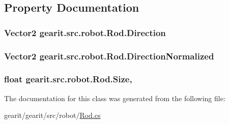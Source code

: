 \subsection{Property Documentation}
\hypertarget{classgearit_1_1src_1_1robot_1_1_rod_aeecb39515796a074caf0159df0a8620a}{
\subsubsection[{Direction}]{\setlength{\rightskip}{0pt plus 5cm}Vector2 gearit.\+src.\+robot.\+Rod.\+Direction\hspace{0.3cm}{\ttfamily [get]}}}\label{classgearit_1_1src_1_1robot_1_1_rod_aeecb39515796a074caf0159df0a8620a}
\hypertarget{classgearit_1_1src_1_1robot_1_1_rod_a167a5c3f6a6c7706a260fcef37f9f2d3}{
\subsubsection[{Direction\+Normalized}]{\setlength{\rightskip}{0pt plus 5cm}Vector2 gearit.\+src.\+robot.\+Rod.\+Direction\+Normalized\hspace{0.3cm}{\ttfamily [get]}}}\label{classgearit_1_1src_1_1robot_1_1_rod_a167a5c3f6a6c7706a260fcef37f9f2d3}
\hypertarget{classgearit_1_1src_1_1robot_1_1_rod_ad81d14d21b0fadeea0babed4dd2dd74a}{
\subsubsection[{Size}]{\setlength{\rightskip}{0pt plus 5cm}float gearit.\+src.\+robot.\+Rod.\+Size\hspace{0.3cm}{\ttfamily [get]}, {\ttfamily [set]}}}\label{classgearit_1_1src_1_1robot_1_1_rod_ad81d14d21b0fadeea0babed4dd2dd74a}


The documentation for this class was generated from the following file\+:\begin{DoxyCompactItemize}
\item 
gearit/gearit/src/robot/\hyperlink{_rod_8cs}{Rod.\+cs}\end{DoxyCompactItemize}
